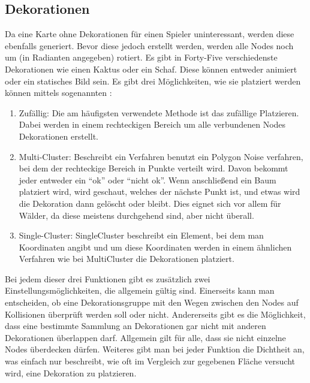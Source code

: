 \subsection{Dekorationen}\label{subsec:dekorationen}
Da eine Karte ohne Dekorationen für einen Spieler uninteressant, werden diese ebenfalls generiert.
Bevor diese jedoch erstellt werden, werden alle Nodes noch um  (in Radianten angegeben) rotiert.
Es gibt in Forty-Five verschiedenste Dekorationen wie einen Kaktus oder ein Schaf.
Diese können entweder animiert oder ein statisches Bild sein.
Es gibt drei Möglichkeiten, wie sie platziert werden können mittels sogenannten :
\begin{enumerate}
    \item Zufällig: Die am häufigsten verwendete Methode ist das zufällige Platzieren.
    Dabei werden in einem rechteckigen Bereich um alle verbundenen Nodes Dekorationen erstellt.
    \item Multi-Cluster: Beschreibt ein Verfahren benutzt ein Polygon Noise verfahren, bei dem der rechteckige Bereich in Punkte verteilt wird.
    Davon bekommt jeder entweder ein ``ok'' oder ``nicht ok''.
    Wenn anschließend ein Baum platziert wird, wird geschaut, welches der nächste Punkt ist, und etwas wird die Dekoration dann gelöscht oder bleibt.
    Dies eignet sich vor allem für \zB Wälder, da diese meistens durchgehend sind, aber nicht überall.
    \item Single-Cluster: SingleCluster beschreibt ein Element, bei dem man Koordinaten angibt und um diese Koordinaten werden in einem ähnlichen Verfahren wie bei MultiCluster die Dekorationen platziert.
\end{enumerate}

Bei jedem dieser drei Funktionen gibt es zusätzlich zwei Einstellungsmöglichkeiten, die allgemein gültig sind.
Einerseits kann man entscheiden, ob eine Dekorationsgruppe mit den Wegen zwischen den Nodes auf Kollisionen überprüft werden soll oder nicht.
Andererseits gibt es die Möglichkeit, dass eine bestimmte Sammlung an Dekorationen gar nicht mit anderen Dekorationen überlappen darf.
Allgemein gilt für alle, dass sie nicht einzelne Nodes überdecken dürfen.
Weiteres gibt man bei jeder Funktion die Dichtheit an, was einfach nur beschreibt, wie oft im Vergleich zur gegebenen Fläche versucht wird, eine Dekoration zu platzieren.